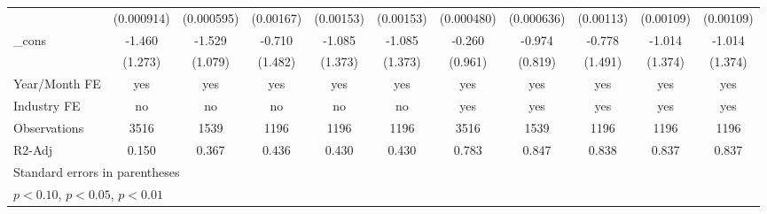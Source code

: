 \begin{table}[htbp]
\begin{tabular}{l*{10}{c}}
                &(0.000914)         &(0.000595)         &(0.00167)         &(0.00153)         &(0.00153)         &(0.000480)         &(0.000636)         &(0.00113)         &(0.00109)         &(0.00109)         \\
\_cons          &   -1.460         &   -1.529         &   -0.710         &   -1.085         &   -1.085         &   -0.260         &   -0.974         &   -0.778         &   -1.014         &   -1.014         \\
                &  (1.273)         &  (1.079)         &  (1.482)         &  (1.373)         &  (1.373)         &  (0.961)         &  (0.819)         &  (1.491)         &  (1.374)         &  (1.374)         \\
\hline
Year/Month FE   &      yes         &      yes         &      yes         &      yes         &      yes         &      yes         &      yes         &      yes         &      yes         &      yes         \\
Industry FE     &       no         &       no         &       no         &       no         &       no         &      yes         &      yes         &      yes         &      yes         &      yes         \\
Observations    &     3516         &     1539         &     1196         &     1196         &     1196         &     3516         &     1539         &     1196         &     1196         &     1196         \\
R2-Adj          &    0.150         &    0.367         &    0.436         &    0.430         &    0.430         &    0.783         &    0.847         &    0.838         &    0.837         &    0.837         \\
\hline\hline
\multicolumn{11}{l}{\footnotesize Standard errors in parentheses}\\
\multicolumn{11}{l}{\footnotesize \sym{*} \(p<0.10\), \sym{**} \(p<0.05\), \sym{***} \(p<0.01\)}\\
\end{tabular}
\end{table}

